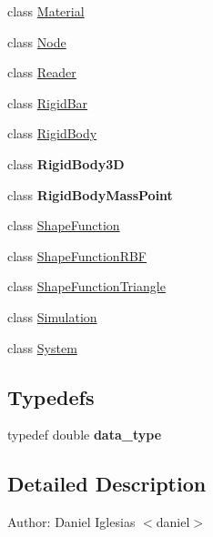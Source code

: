 \begin{CompactItemize}
\item 
class \hyperlink{classmknix_1_1Material}{Material}
\item 
class \hyperlink{classmknix_1_1Node}{Node}
\item 
class \hyperlink{classmknix_1_1Reader}{Reader}
\item 
class \hyperlink{classmknix_1_1RigidBar}{RigidBar}
\item 
class \hyperlink{classmknix_1_1RigidBody}{RigidBody}
\item 
class \textbf{RigidBody3D}
\item 
class \textbf{RigidBodyMassPoint}
\item 
class \hyperlink{classmknix_1_1ShapeFunction}{ShapeFunction}
\item 
class \hyperlink{classmknix_1_1ShapeFunctionRBF}{ShapeFunctionRBF}
\item 
class \hyperlink{classmknix_1_1ShapeFunctionTriangle}{ShapeFunctionTriangle}
\item 
class \hyperlink{classmknix_1_1Simulation}{Simulation}
\item 
class \hyperlink{classmknix_1_1System}{System}
\end{CompactItemize}
\subsection*{Typedefs}
\begin{CompactItemize}
\item 
\hypertarget{namespacemknix_16be4b246fbf2cceb141e3a179111020}{
typedef double \textbf{data\_\-type}}
\label{namespacemknix_16be4b246fbf2cceb141e3a179111020}

\end{CompactItemize}


\subsection{Detailed Description}
\begin{Desc}
\item[Author:]Daniel Iglesias $<$daniel$>$ \end{Desc}
